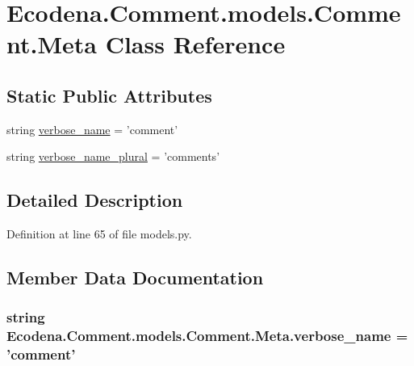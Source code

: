 \hypertarget{class_ecodena_1_1_comment_1_1models_1_1_comment_1_1_meta}{
\section{Ecodena.Comment.models.Comment.Meta Class Reference}
\label{d4/d24/class_ecodena_1_1_comment_1_1models_1_1_comment_1_1_meta}
}
\subsection*{Static Public Attributes}
\begin{DoxyCompactItemize}
\item 
string \hyperlink{class_ecodena_1_1_comment_1_1models_1_1_comment_1_1_meta_a20eda28cd22d10df2c33831253f926ee}{verbose\_\-name} = 'comment'
\item 
string \hyperlink{class_ecodena_1_1_comment_1_1models_1_1_comment_1_1_meta_ab47cb8c6b3591a60ce7470138312f77a}{verbose\_\-name\_\-plural} = 'comments'
\end{DoxyCompactItemize}


\subsection{Detailed Description}


Definition at line 65 of file models.py.



\subsection{Member Data Documentation}
\hypertarget{class_ecodena_1_1_comment_1_1models_1_1_comment_1_1_meta_a20eda28cd22d10df2c33831253f926ee}{
\subsubsection[{verbose\_\-name}]{\setlength{\rightskip}{0pt plus 5cm}string {\bf Ecodena.Comment.models.Comment.Meta.verbose\_\-name} = 'comment'}}
\label{d4/d24/class_ecodena_1_1_comment_1_1models_1_1_comment_1_1_meta_a20eda28cd22d10df2c33831253f926ee}


